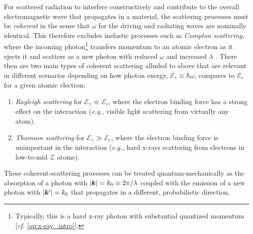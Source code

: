 For scattered radiation to interfere constructively and contribute to the overall electromagnetic wave that propagates in a material, the scattering processes must be \emph{coherent} in the sense that $\omega$ for the driving and radiating waves are nominally identical. 
This therefore excludes inelastic processes such as \emph{Compton scattering}, where the incoming photon\footnote{Typically, this is a hard x-ray photon with substantial quantized momentum [\emph{cf.\@} \cref{ap:x-ray_intro}].} transfers momentum to an atomic electron as it ejects it and scatters as a new photon with reduced $\omega$ and increased $\lambda$ \cite{Als-Nielsen11}. 
There then are two main types of coherent scattering alluded to above that are relevant in different scenarios depending on how photon energy, $\mathcal{E}_{\gamma} \equiv \hbar \omega$, compares to $\mathcal{E}_e$ for a given atomic electron: 
\begin{enumerate}[noitemsep]
 \item \emph{Rayleigh scattering} for $\mathcal{E}_{\gamma} \ll \mathcal{E}_e$, where the electron binding force has a strong effect on the interaction (\emph{e.g.}, visible light scattering from virtually any atom). 
 \item \emph{Thomson scattering} for $\mathcal{E}_{\gamma} \gg \mathcal{E}_e$, where the electron binding force is unimportant in the interaction (\emph{e.g.}, hard x-rays scattering from electrons in low-to-mid $\mathcal{Z}$ atoms). 
 \end{enumerate} 
These coherent-scattering processes can be treated quantum-mechanically as the absorption of a photon with $\abs{\mathbold{k}} = k_0 \equiv 2 \pi / \lambda$ coupled with the emission of a new photon with $\abs{\mathbold{k}'} = k_0$ that propagates in a different, probabilistic direction. 

